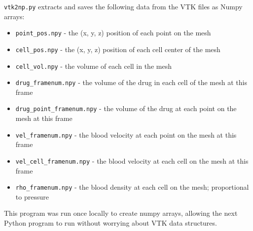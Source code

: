 \documentclass[11pt]{article} %
\newcommand{\tty}[1]{\texttt{#1}}
\begin{document}
\tty{vtk2np.py} extracts and saves the following data from the VTK files as Numpy arrays:
\begin{itemize}
\item \tty{point\_pos.npy} - the (x, y, z) position of each point on the mesh
\item \tty{cell\_pos.npy} - the (x, y, z) position of each cell center of the mesh
\item \tty{cell\_vol.npy} - the volume of each cell in the mesh
\item \tty{drug\_framenum.npy} - the volume of the drug in each cell of the mesh at this frame
\item \tty{drug\_point\_framenum.npy} - the volume of the drug at each point on the mesh at this frame
\item \tty{vel\_framenum.npy} - the blood velocity at each point on the mesh at this frame
\item \tty{vel\_cell\_framenum.npy} - the blood velocity at each cell on the mesh at this frame
\item \tty{rho\_framenum.npy} - the blood density at each cell on the mesh; proportional to pressure
\end{itemize}
This program was run once locally to create numpy arrays, allowing the
next Python program to run without worrying about VTK data structures.
\end{document}
